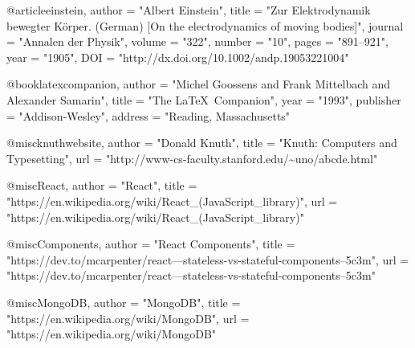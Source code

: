 @article{einstein,
    author =       "Albert Einstein",
    title =        "{Zur Elektrodynamik bewegter K{\"o}rper}. ({German})
        [{On} the electrodynamics of moving bodies]",
    journal =      "Annalen der Physik",
    volume =       "322",
    number =       "10",
    pages =        "891--921",
    year =         "1905",
    DOI =          "http://dx.doi.org/10.1002/andp.19053221004"
}
 
@book{latexcompanion,
    author    = "Michel Goossens and Frank Mittelbach and Alexander Samarin",
    title     = "The \LaTeX\ Companion",
    year      = "1993",
    publisher = "Addison-Wesley",
    address   = "Reading, Massachusetts"
}
 
@misc{knuthwebsite,
    author    = "Donald Knuth",
    title     = "Knuth: Computers and Typesetting",
    url       = "http://www-cs-faculty.stanford.edu/\~{}uno/abcde.html"
}

@misc{React,
	author    = "React",
	title     = "https://en.wikipedia.org/wiki/React_(JavaScript_library)",
	url       = "https://en.wikipedia.org/wiki/React_(JavaScript_library)"
}

@misc{Components,
	author    = "React Components",
	title     = "https://dev.to/mcarpenter/react---stateless-vs-stateful-components--5c3m",
	url       = "https://dev.to/mcarpenter/react---stateless-vs-stateful-components--5c3m"
}

@misc{MongoDB,
	author    = "MongoDB",
	title     = "https://en.wikipedia.org/wiki/MongoDB",
	url       = "https://en.wikipedia.org/wiki/MongoDB"
}